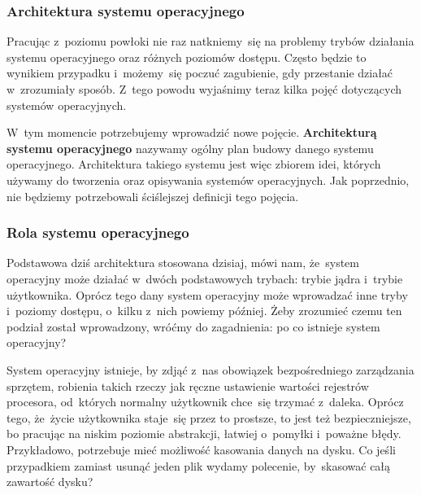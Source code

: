 \documentclass[10pt,t]{beamer}
\begin{document}
\begin{frame}
  \frametitle{Architektura systemu operacyjnego}


  Pracując z~poziomu powłoki nie raz natkniemy~się na problemy
  trybów działania systemu operacyjnego oraz różnych poziomów dostępu.
  Często będzie to wynikiem przypadku i~możemy~się poczuć zagubienie,
  gdy przestanie działać w~zrozumiały sposób. Z~tego powodu wyjaśnimy teraz
  kilka pojęć dotyczących systemów operacyjnych.

  W~tym momencie potrzebujemy wprowadzić nowe pojęcie.
  \textbf{Architekturą systemu operacyjnego} nazywamy ogólny plan budowy
  danego systemu operacyjnego. Architektura takiego systemu jest więc
  zbiorem idei, których używamy do tworzenia oraz opisywania systemów
  operacyjnych. Jak poprzednio, nie będziemy potrzebowali ściślejszej
  definicji tego pojęcia.

\end{frame}





\begin{frame}
  \frametitle{Rola systemu operacyjnego}


  Podstawowa dziś architektura stosowana dzisiaj, mówi nam, że~system
  operacyjny może działać w~dwóch podstawowych trybach: trybie jądra
  i~trybie użytkownika. Oprócz tego dany system operacyjny może wprowadzać
  inne tryby i~poziomy dostępu, o~kilku z~nich powiemy później. Żeby
  zrozumieć czemu ten podział został wprowadzony, wróćmy do zagadnienia:
  po co istnieje system operacyjny?

  System operacyjny istnieje, by zdjąć z~nas obowiązek bezpośredniego
  zarządzania sprzętem, robienia takich rzeczy jak ręczne ustawienie
  wartości rejestrów procesora, od~których normalny użytkownik chce~się
  trzymać z~daleka. Oprócz tego, że~życie użytkownika staje~się przez to
  prostsze,
  to jest też bezpieczniejsze, bo pracując na niskim poziomie abstrakcji,
  łatwiej o~pomyłki i~poważne błędy. Przykładowo, potrzebuje mieć możliwość
  kasowania danych na dysku. Co jeśli przypadkiem zamiast usunąć jeden
  plik wydamy polecenie, by~skasować całą zawartość dysku?

\end{frame}
\end{document}
